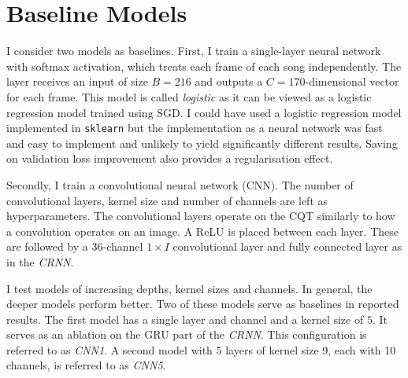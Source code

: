 \section{Baseline Models}\label{sec:baselines}

I consider two models as baselines. First, I train a single-layer neural network with softmax activation, which treats each frame of each song independently. The layer receives an input of size $B=216$ and outputs a $C=170$-dimensional vector for each frame. This model is called \emph{logistic} as it can be viewed as a logistic regression model trained using SGD. I could have used a logistic regression model implemented in \texttt{sklearn} but the implementation as a neural network was fast and easy to implement and unlikely to yield significantly different results. Saving on validation loss improvement also provides a regularisation effect.

Secondly, I train a convolutional neural network (CNN). The number of convolutional layers, kernel size and number of channels are left as hyperparameters. The convolutional layers operate on the CQT similarly to how a convolution operates on an image. A ReLU is placed between each layer. These are followed by a 36-channel $1\times I$ convolutional layer and fully connected layer as in the \emph{CRNN}. 

I test models of increasing depths, kernel sizes and channels. In general, the deeper models perform better. Two of these models serve as baselines in reported results. The first model has a single layer and channel and a kernel size of $5$. It serves as an ablation on the GRU part of the \emph{CRNN}. This configuration is referred to as \emph{CNN1}. A second model with 5 layers of kernel size 9, each with 10 channels, is referred to as \emph{CNN5}.

